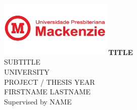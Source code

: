 \documentclass[12pt, a4paper]{scrreprt}
\begin{document}

\begin{titlepage}
	\begin{center}
	\includegraphics[width=0.4\textwidth]{logos/logo-university.jpg}
	\hfill
		\Huge
		\vfill
		\textbf{TITLE}
		\\
		\normalsize
		SUBTITLE 
		\\
		\vspace{5cm}
		UNIVERSITY  \\
		PROJECT / THESIS YEAR \\
		FIRSTNAME LASTNAME \\
		Supervised by NAME 
		\date{\today}
	\end{center}
\end{titlepage}





\tableofcontents









\appendixpage
\begin{appendix}






\end{appendix}	



\end{document}
